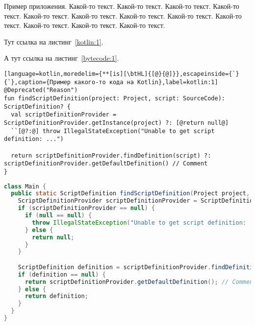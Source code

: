 Пример приложения. Какой-то текст. Какой-то текст. Какой-то текст. Какой-то текст. Какой-то текст. Какой-то текст. Какой-то текст. Какой-то текст. Какой-то текст. Какой-то текст. Какой-то текст. Какой-то текст.

Тут ссылка на листинг~\ref{kotlin:1}.

А тут ссылка на листинг~\ref{bytecode:1}.

\begin{lstlisting}[language=kotlin,moredelim={**[is][\btHL]{[@}{@]}},escapeinside={`}{`},caption={Пример какого-то кода на Kotlin},label=kotlin:1]
@Deprecated("Reason")
fun findScriptDefinition(project: Project, script: SourceCode): ScriptDefinition? {
  val scriptDefinitionProvider = ScriptDefinitionProvider.getInstance(project) ?: [@return null@]
  ``[@?:@] throw IllegalStateException("Unable to get script definition: ...")

  return scriptDefinitionProvider.findDefinition(script) ?: scriptDefinitionProvider.getDefaultDefinition() // Comment
}
\end{lstlisting}

\begin{lstlisting}[language=java,caption={Пример какого-то кода на Java},label=java:1]
class Main {
  public static ScriptDefinition findScriptDefinition(Project project, SourceCode script) {
    ScriptDefinitionProvider scriptDefinitionProvider = ScriptDefinitionProvider.getInstance(project);
    if (scriptDefinitionProvider == null) {
      if (null == null) {
        throw IllegalStateException("Unable to get script definition: ...");
      } else {
        return null;
      }
    }

    ScriptDefinition definition = scriptDefinitionProvider.findDefinition(script);
    if (definition == null) {
      return scriptDefinitionProvider.getDefaultDefinition(); // Comment
    } else {
      return definition;
    }
  }
}
\end{lstlisting}

\newcommand{\createlinenumber}[2]{
    \edef\thelstnumber{%
        \unexpanded{%
            \ifnum#1=\value{lstnumber}\relax
              #2%
            \fi%
        }%
        \ifx\thelstnumber\relax%
        \else\expandafter\unexpanded\expandafter{\thelstnumber}%
        \fi%
    }
}

\bgroup
\let\thelstnumber\relax
\createlinenumber{2}{13}
\createlinenumber{3}{14}
\createlinenumber{4}{15}
\createlinenumber{5}{18}
\createlinenumber{6}{21}
\createlinenumber{7}{22}
\createlinenumber{8}{24}
\createlinenumber{9}{27}

